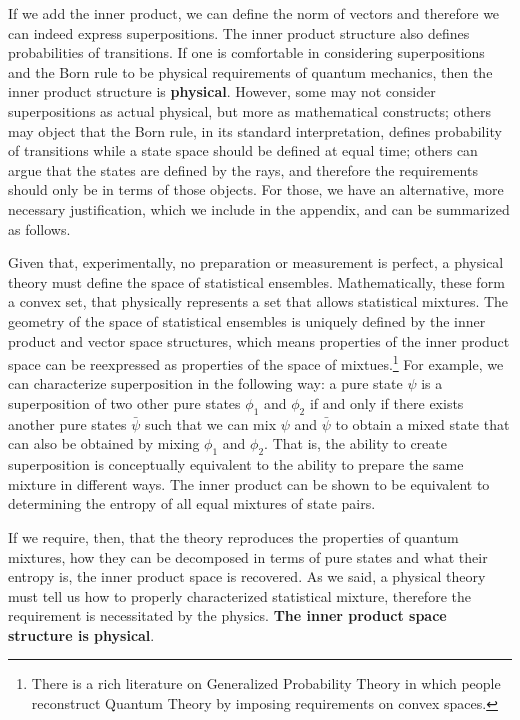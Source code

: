 \documentclass[10pt,twocolumn, nofootinbib]{revtex4-2}
\begin{document}
If we add the inner product, we can define the norm of vectors and therefore we can indeed express superpositions. The inner product structure also defines probabilities of transitions. If one is comfortable in considering superpositions and the Born rule to be physical requirements of quantum mechanics, then the inner product structure is \textbf{physical}. However, some may not consider superpositions as actual physical, but more as mathematical constructs; others may object that the Born rule, in its standard interpretation, defines probability of transitions while a state space should be defined at equal time; others can argue that the states are defined by the rays, and therefore the requirements should only be in terms of those objects. For those, we have an alternative, more necessary justification, which we include in the appendix, and can be summarized as follows.

Given that, experimentally, no preparation or measurement is perfect, a physical theory must define the space of statistical ensembles. Mathematically, these form a convex set, that physically represents a set that allows statistical mixtures. The geometry of the space of statistical ensembles is uniquely defined by the inner product and vector space structures, which means properties of the inner product space can be reexpressed as properties of the space of mixtues.\footnote{There is a rich literature on Generalized Probability Theory in which people reconstruct Quantum Theory by imposing requirements on convex spaces.} For example, we can characterize superposition in the following way: a pure state $\psi$ is a superposition of two other pure states $\phi_1$ and $\phi_2$ if and only if there exists another pure states $\bar{\psi}$ such that we can mix $\psi$ and $\bar{\psi}$ to obtain a mixed state that can also be obtained by mixing $\phi_1$ and $\phi_2$. That is, the ability to create superposition is conceptually equivalent to the ability to prepare the same mixture in different ways. The inner product can be shown to be equivalent to determining the entropy of all equal mixtures of state pairs.

If we require, then, that the theory reproduces the properties of quantum mixtures, how they can be decomposed in terms of pure states and what their entropy is, the inner product space is recovered. As we said, a physical theory must tell us how to properly characterized statistical mixture, therefore the requirement is necessitated by the physics. \textbf{The inner product space structure is physical}.
\end{document}
